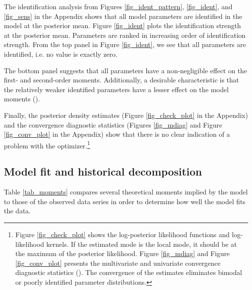 \documentclass[a4paper,11pt]{article}
\numberwithin{equation}{section}
\begin{document}
	The identification analysis from Figures \ref{fig_ident_pattern}, \ref{fig_ident}, and \ref{fig_sens} in the Appendix shows that all model parameters are identified in the model at the posterior mean. Figure \ref{fig_ident} plots the identification strength at the	posterior mean. Parameters are ranked in increasing order of identification strength. From the top panel in Figure \ref{fig_ident}, we see that all parameters are identified, i.e. no value is exactly zero. 
	
	The bottom panel suggests that all parameters have a non-negligible effect on the first- and second-order moments. Additionally, a desirable characteristic is that the relatively weaker identified parameters have a lesser effect on the model moments (\citealp{hollander2018}).
	
	Finally, the posterior density estimates (Figure \ref{fig_check_plot} in the Appendix) and the convergence diagnostic statistics (Figures \ref{fig_mdiag} and Figure \ref{fig_conv_plot} in the Appendix) show that there is no clear indication of a problem with the optimizer.\footnote{Figure \ref{fig_check_plot} shows the log-posterior likelihood functions and log-likelihood kernels. If the estimated mode is the local mode, it should be at the maximum of the posterior likelihood. Figure \ref{fig_mdiag} and Figure \ref{fig_conv_plot} presents the multivariate and univariate convergence diagnostic statistics (\citealp{brooks1998}). The convergence of the estimates eliminates bimodal or poorly identified parameter distributions.}
	
	\subsection{Model fit and historical decomposition}
	
	Table \ref{tab_moments} compares several theoretical moments implied by the model to those of the observed data series in order to determine how well the model fits the data.  
	
\end{document}
